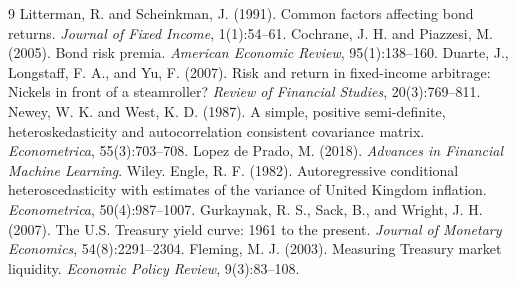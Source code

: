 \documentclass[12pt]{article}
\begin{document}
\begin{thebibliography}{9}
 Litterman, R. and Scheinkman, J. (1991). Common factors affecting bond returns. \textit{Journal of Fixed Income}, 1(1):54--61.
 Cochrane, J. H. and Piazzesi, M. (2005). Bond risk premia. \textit{American Economic Review}, 95(1):138--160.
 Duarte, J., Longstaff, F. A., and Yu, F. (2007). Risk and return in fixed-income arbitrage: Nickels in front of a steamroller? \textit{Review of Financial Studies}, 20(3):769--811.
 Newey, W. K. and West, K. D. (1987). A simple, positive semi-definite, heteroskedasticity and autocorrelation consistent covariance matrix. \textit{Econometrica}, 55(3):703--708.
 Lopez de Prado, M. (2018). \textit{Advances in Financial Machine Learning}. Wiley.
 Engle, R. F. (1982). Autoregressive conditional heteroscedasticity with estimates of the variance of United Kingdom inflation. \textit{Econometrica}, 50(4):987--1007.
 Gurkaynak, R. S., Sack, B., and Wright, J. H. (2007). The U.S. Treasury yield curve: 1961 to the present. \textit{Journal of Monetary Economics}, 54(8):2291--2304.
 Fleming, M. J. (2003). Measuring Treasury market liquidity. \textit{Economic Policy Review}, 9(3):83--108.
\end{thebibliography}
\end{document}
